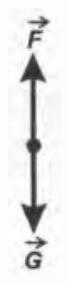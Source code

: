 \documentclass[10pt]{article}
\begin{document}
\begin{center}
\includegraphics[max width=\textwidth]{2025_07_01_5b3ff9fa0d508c8e9f17g-242}
\end{center}
\end{document}
